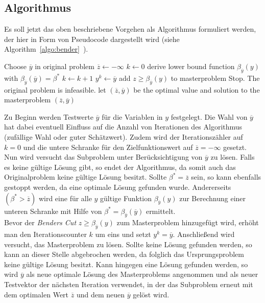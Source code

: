\documentclass[a4paper, 11pt]{scrreprt}
\begin{document}
\subsection*{Algorithmus}
Es soll jetzt das oben beschriebene Vorgehen als Algorithmus formuliert werden, der hier in Form von
Pseudocode dargestellt wird (siehe Algorithm~\ref{algo:bender}~\cite{bender}).
\begin{algorithm}[htb!]
  \centering
  \caption{}
  \label{algo:bender}
  \begin{algorithmic}[1]
    \STATE Choose $\overline{y}$ in original problem
    \STATE $\overline{z} \leftarrow -\infty$
    \STATE $k \leftarrow 0$
      \STATE derive lower bound function $\beta_{\overline{y}}(y)$ with $\beta_{\overline{y}}(\overline{y}) = \beta^*$
      \STATE $k \leftarrow k + 1$
      \STATE $y^k \leftarrow \overline{y}$
      \STATE add $z \geq \beta_{\overline{y}}(y)$ to masterproblem
        \STATE Stop. The original problem is infeasible.
      \ELSE
        \STATE let $(\overline{z}, \overline{y})$ be the optimal value and solution to the masterproblem
      \ENDIF
    \ENDWHILE
    \RETURN $(\overline{z}, \overline{y})$
  \end{algorithmic}
\end{algorithm}
Zu Beginn werden Testwerte $\overline{y}$ für die Variablen in $y$ festgelegt. Die Wahl von $\overline{y}$ hat dabei
eventuell Einfluss auf die Anzahl von Iterationen des Algorithmus (zufällige Wahl oder guter Schätzwert).
Zudem wird der Iterationszähler auf $k = 0$ und die untere Schranke für den Zielfunktionswert auf
$\overline{z} = -\infty$ gesetzt.
Nun wird versucht das Subproblem unter Berücksichtigung von $\overline{y}$ zu lösen. Falls es keine gültige
Lösung gibt, so endet der Algorithmus, da somit auch das Originalproblem keine gültige Lösung besitzt.
Sollte $\beta^* = \overline{z}$ sein, so kann ebenfalls gestoppt werden, da eine optimale Lösung gefunden
wurde.
Andererseits $(\beta^* > \overline{z})$ wird eine für alle $y$ gültige Funktion $\beta_{\overline{y}}(y)$ zur Berechnung
einer unteren Schranke mit Hilfe von $\beta^* = \beta_{\overline{y}}(\overline{y})$ ermittelt.\\
Bevor der \textit{Benders Cut} $z \geq \beta_{\overline{y}}(y)$ zum Masterproblem hinzugefügt wird,
erhöht man den Iterationscounter $k$ um eins und setzt $y^k = \overline{y}$.
Anschließend wird versucht, das Masterproblem zu lösen. Sollte keine Lösung gefunden werden, so kann an
dieser Stelle abgebrochen werden, da folglich das Ursprungsproblem keine gültige Lösung besitzt.
Kann hingegen eine Lösung gefunden werden, so wird $\overline{y}$ als neue optimale Lösung
des Masterproblems angenommen und als neuer Testvektor der nächsten Iteration verwendet,
in der das Subproblem erneut mit dem optimalen Wert $\overline{z}$ und dem neuen $\overline{y}$
gelöst wird.
\end{document}
